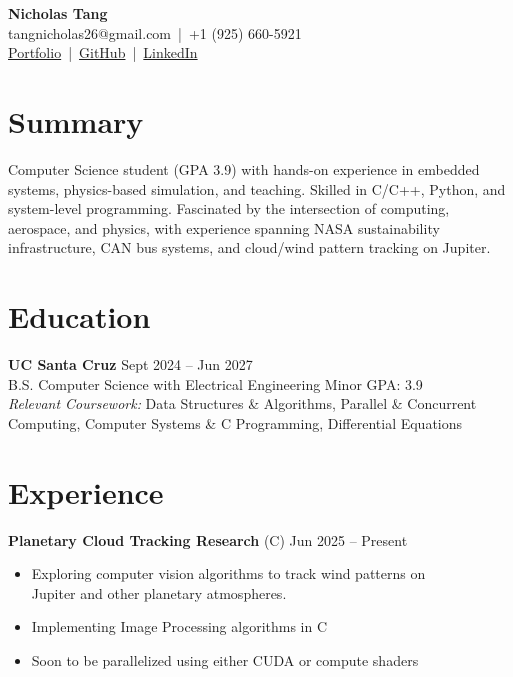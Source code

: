 \documentclass[a4paper,10pt]{article}
\begin{document}

\begin{center}
    {\LARGE \textbf{Nicholas Tang}} \\ [0.5em]
    tangnicholas26@gmail.com \,|\, +1 (925) 660-5921 \\ [0.3em]
    \href{https://nicholas-tangerine.github.io}{Portfolio} \,|\, 
    \href{https://github.com/nicholas-tangerine}{GitHub} \,|\, 
    \href{https://linkedin.com/in/nicholas-tangerine}{LinkedIn}
\end{center}

\section*{Summary}
Computer Science student (GPA 3.9) with hands-on experience in embedded
systems, physics-based simulation, and teaching. Skilled in C/C++, Python, and
system-level programming. Fascinated by the intersection of computing,
aerospace, and physics, with experience spanning NASA sustainability
infrastructure, CAN bus systems, and cloud/wind pattern tracking on Jupiter.

\section*{Education}
\textbf{UC Santa Cruz} \hfill Sept 2024 -- Jun 2027 \\
B.S. Computer Science with Electrical Engineering Minor \hfill GPA: 3.9 \\
\textit{Relevant Coursework:} Data Structures \& Algorithms, Parallel \& Concurrent \\ 
Computing, Computer Systems \& C Programming, Differential Equations

\section*{Experience}
\textbf{Planetary Cloud Tracking Research} (C) \hfill Jun 2025 -- Present
\begin{itemize}
    \item Exploring computer vision algorithms to track wind patterns on \\
        Jupiter and other planetary atmospheres.
    \item Implementing Image Processing algorithms in C
    \item Soon to be parallelized using either CUDA or compute shaders
\end{itemize}
\end{document}
